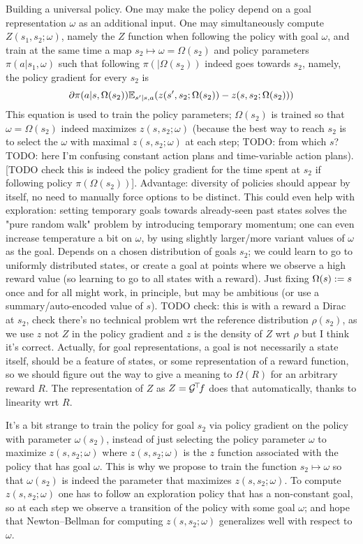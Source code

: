 \documentclass[11pt,a4paper]{article}
\newcommand{\green}{\mathcal{G}}
\begin{document}
Building a universal policy. One may make the policy depend on a goal
representation $\omega$ as an additional input. One may simultaneously
compute $Z(s_1,s_2;\omega)$, namely the $Z$ function when following the
policy with goal $\omega$, and train at the same time a map $s_2\mapsto \omega=\Omega(s_2)$ and
policy parameters $\pi(a|s_1,\omega)$ such that following
$\pi(|\Omega(s_2))$ indeed goes towards $s_2$, namely, the policy
gradient for every $s_2$ is
\begin{equation}
\partial \pi(a|s,\Omega(s_2))\mathbb{E}_{s'|s,a} 
(z(s',s_2;\Omega(s_2))-z(s,s_2;\Omega(s_2)))
\end{equation}
This equation is used to train the policy parameters; $\Omega(s_2)$ is
trained so that $\omega=\Omega(s_2)$ indeed maximizes $z(s,s_2;\omega)$
(because the best way to reach $s_2$ is to select the $\omega$ with
maximal $z(s,s_2;\omega)$ at each step; TODO: from which $s$? TODO: here
I'm confusing constant action plans and time-variable action plans).
[TODO check this is indeed the policy gradient for the time spent at
$s_2$ if following policy $\pi(\Omega(s_2))$]. Advantage: diversity of
policies should appear by itself, no need to manually force options to be
distinct. This could even help with exploration:
setting temporary goals towards already-seen past states solves the "pure
random walk" problem by introducing temporary momentum; one can even
increase temperature a bit on $\omega$, by using slightly larger/more
variant values of $\omega$ as the goal. Depends on a chosen distribution of goals $s_2$; we could learn
to go to uniformly distributed states, or create a goal at points where
we observe a high reward value (so learning to go to all states with a
reward). Just fixing $\Omega(s)\mathrel{\mathop{:}}= s$ once and for all might work, in
principle, but may be ambitious (or use a summary/auto-encoded value of
$s$). TODO check:
this is with a reward a Dirac at $s_2$, check there's no technical
problem wrt the reference distribution $\rho(s_2)$, as we use $z$ not $Z$
in the policy gradient and $z$ is the density of $Z$ wrt $\rho$ but I
think it's correct. Actually, for goal representations, a goal is not
necessarily a state itself, should be a feature of states, or some
representation of a reward function, so we should figure out the way to
give a meaning to $\Omega(R)$ for an arbitrary reward $R$. The
representation of $Z$ as $Z=\transp{\green}f$ does that automatically,
thanks to linearity wrt $R$.

It's a bit strange to train the policy for goal $s_2$ via policy gradient
on the policy with parameter $\omega(s_2)$, instead of just selecting the
policy parameter $\omega$ to maximize $z(s,s_2;\omega)$ where
$z(s,s_2;\omega)$ is the $z$ function associated with the policy that has
goal $\omega$.  This is why we propose to train the function $s_2\mapsto
\omega$ so that $\omega(s_2)$ is indeed the parameter that maximizes
$z(s,s_2;\omega)$.
To compute $z(s,s_2;\omega)$ one has to follow an
exploration policy that has a non-constant goal, so at each step we
observe a transition of the policy with some goal $\omega$; and hope that
Newton--Bellman for computing $z(s,s_2;\omega)$ generalizes well with
respect to $\omega$.
\end{document}
